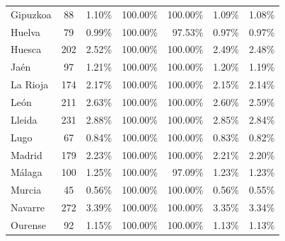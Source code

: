 \documentclass[a4paper,11pt,oneside]{article}
\begin{document}
{\begin{table}
{\begin{tabular}{lcrrrrr}
Gipuzkoa          & 88                             & 1.10\%          & 100.00\%      & 100.00\%      & 1.09\%                 & 1.08\%                 \\
Huelva             & 79                             & 0.99\%          & 100.00\%      & 97.53\%       & 0.97\%                 & 0.97\%                 \\
Huesca             & 202                            & 2.52\%          & 100.00\%      & 100.00\%      & 2.49\%                 & 2.48\%                 \\
Jaén               & 97                             & 1.21\%          & 100.00\%      & 100.00\%      & 1.20\%                 & 1.19\%                 \\
La Rioja           & 174                            & 2.17\%          & 100.00\%      & 100.00\%      & 2.15\%                 & 2.14\%                 \\
León               & 211                            & 2.63\%          & 100.00\%      & 100.00\%      & 2.60\%                 & 2.59\%                 \\
Lleida             & 231                            & 2.88\%          & 100.00\%      & 100.00\%      & 2.85\%                 & 2.84\%                 \\
Lugo               & 67                             & 0.84\%          & 100.00\%      & 100.00\%      & 0.83\%                 & 0.82\%                 \\
Madrid             & 179                            & 2.23\%          & 100.00\%      & 100.00\%      & 2.21\%                 & 2.20\%                 \\
Málaga             & 100                            & 1.25\%          & 100.00\%      & 97.09\%       & 1.23\%                 & 1.23\%                 \\
Murcia             & 45                             & 0.56\%          & 100.00\%      & 100.00\%      & 0.56\%                 & 0.55\%                 \\
Navarre            & 272                            & 3.39\%          & 100.00\%      & 100.00\%      & 3.35\%                 & 3.34\%                 \\
Ourense            & 92                             & 1.15\%          & 100.00\%      & 100.00\%      & 1.13\%                 & 1.13\%                 \\

\end{tabular}}
\end{table}}
\end{document}
